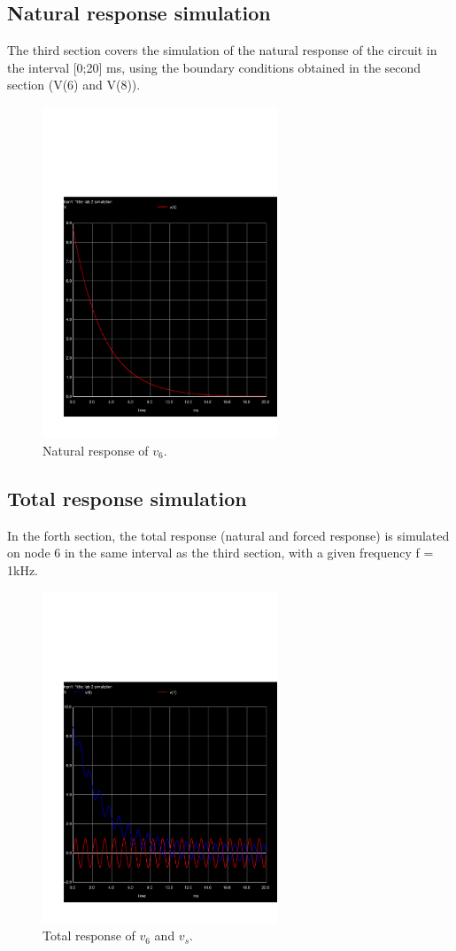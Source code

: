 \subsection{Natural response simulation}
The third section covers the simulation of the natural response of the circuit in the interval [0;20] ms, using the boundary conditions obtained in the second section (V(6) and V(8)).
\begin{figure}[h!] \centering
\includegraphics[width=7cm]{../sim/trans.pdf}
\caption{Natural response of $v_6$.}
\label{fig:trans}
\end{figure}
\newpage
\subsection{Total response simulation}
In the forth section, the total response (natural and forced response) is simulated on node 6 in the same interval as the third section, with a given frequency f = 1kHz.
\begin{figure}[h!] \centering
\includegraphics[width=7cm]{../sim/trans2.pdf}
\caption{Total response of $v_6$ and $v_s$.}
\label{fig:trans2}
\end{figure}
\newpage
